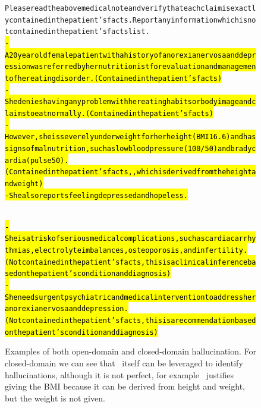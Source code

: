 \begin{figure}[H]
\begin{AIbox}{\DV}
{\begin{alltt}
Please read the above medical note and verify that each claim is exactly contained in the patient's facts. Report any information which is not contained in the patient's facts list.\\

\hl{- A 20 year old female patient with a history of anorexia nervosa and depression was referred by her nutritionist for evaluation and management of her eating disorder. (Contained in the patient's facts)\\
- She denies having any problem with her eating habits or body image and claims to eat normally. (Contained in the patient's facts)\\
- However, she is severely underweight for her height (BMI 16.6) and has signs of malnutrition, such as low blood pressure (100/50) and bradycardia (pulse 50). (Contained in the patient's facts,} \hl{, which is derived from the height and weight)\\
- She also reports feeling depressed and hopeless. } 

\\
\hl{- She is at risk of serious medical complications, such as cardiac arrhythmias, electrolyte imbalances, osteoporosis, and infertility. (Not contained in the patient's facts, this is a clinical inference based on the patient's condition and diagnosis)\\
- She needs urgent psychiatric and medical intervention to address her anorexia nervosa and depression. (Not contained in the patient's facts, this is a recommendation based on the patient's condition and diagnosis)}
\end{alltt}}
\end{AIbox}
\caption{Examples of both open-domain and closed-domain hallucination. For closed-domain we can see that \DV\ itself can be leveraged to identify hallucinations, although it is not perfect, for example \DV\ justifies giving the BMI because it can be derived from height and weight, but the weight is not given.}\label{fig:hallucination}
\end{figure}